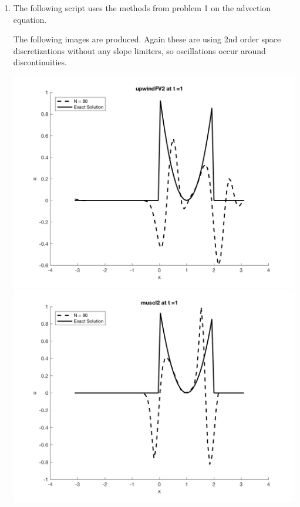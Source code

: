 \documentclass[11pt, oneside]{article}
\begin{document}
\begin{enumerate}
  \item %
    The following script uses the methods from problem 1 on the advection
    equation.
    
    The following images are produced.
    Again these are using 2nd order space discretizations without any slope
    limiters, so oscillations occur around discontinuities.
    \begin{center}
      \includegraphics[scale=0.4]{Figures/06_04.png}
      \includegraphics[scale=0.4]{Figures/06_05.png}

\end{center}
\end{enumerate}
\end{document}
